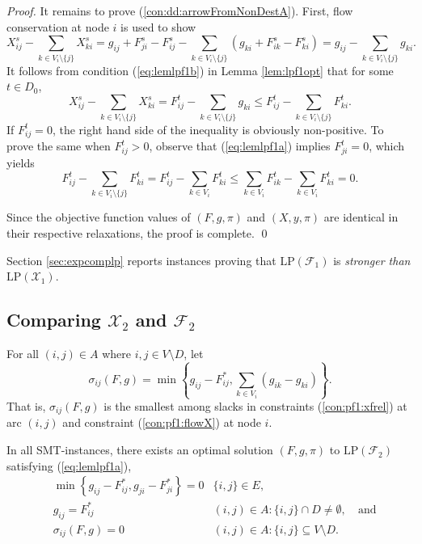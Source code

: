 \begin{proof}
It remains to prove (\ref{con:dd:arrowFromNonDestA}).
First, flow conservation at node $i$ is used to show
\[
  X_{ij}^s - \sum_{k\in V_{i}\setminus\{j\}}X^s_{ki} = g_{ij}+F_{ji}^s-F_{ij}^s - \sum_{k\in V_{i}\setminus\{j\}}\left(g_{ki}+F_{ik}^s-F_{ki}^s\right)
  = g_{ij}-\sum_{k\in V_{i}\setminus\{j\}}g_{ki}.
\]
It follows from condition (\ref{eq:lemlpf1b}) in Lemma \ref{lem:lpf1opt} that 
for some $t\in D_0$,
\[
  X_{ij}^s - \sum_{k\in V_{i}\setminus\{j\}}X^s_{ki}
  = F_{ij}^{t}-\sum_{k\in V_{i}\setminus\{j\}}g_{ki}
  \leq F_{ij}^{t}-\sum_{k\in V_{i}\setminus\{j\}}F_{ki}^{t}.
\]
If $F_{ij}^{t}=0$, the right hand side of the inequality is obviously non-positive.
To prove the same when $F_{ij}^{t}>0$, observe that (\ref{eq:lemlpf1a}) implies $F_{ji}^{t}=0$, which yields
\[
  F_{ij}^{t}-\sum_{k\in V_{i}\setminus\{j\}}F_{ki}^{t}
  = F_{ij}^{t}-\sum_{k\in V_{i}}F_{ki}^{t}
  \leq \sum_{k\in V_i}F_{ik}^{t}-\sum_{k\in V_{i}}F_{ki}^{t} = 0.
\]

Since the objective function values of $(F,g,\pi)$ and $(X,y,\pi)$ are identical in their respective relaxations, the proof is complete.
\qed\end{proof}

\begin{remark}
\label{rem:f1strx1}
Section \ref{sec:expcomplp} reports instances proving that $\text{LP}(\mathcal{F}_1)$ is \emph{stronger than} $\text{LP}(\mathcal{X}_1)$. 
\end{remark}

\subsection{Comparing $\mathcal{X}_2$ and $\mathcal{F}_2$}
For all $(i,j)\in A$ where $i,j\in V\setminus D$, let
$$\sigma_{ij}(F,g) = \min\left\{g_{ij} - F^*_{ij}, \sum_{k\in V_{i}}\left(g_{ik}-g_{ki}\right)\right\}.$$
That is, $\sigma_{ij}(F,g)$ is the smallest among slacks in constraints (\ref{con:pf1:xfrel}) at arc $(i,j)$ and constraint (\ref{con:pf1:flowX}) at node $i$.
 
\begin{lemma} \label{lem:lpf2}
In all SMT-instances, there exists an optimal solution $(F,g,\pi)$ to $\text{LP}(\mathcal{F}_2)$ satisfying (\ref{eq:lemlpf1a}),
\begin{subequations}
\begin{align}
 & \min\left\{g_{ij} - F_{ij}^*, g_{ji} - F_{ji}^*\right\} = 0 & \{i,j\}\in E, & \label{eq:lemlpf2a} \\
 & g_{ij} = F_{ij}^* & (i,j)\in A: \{i,j\}\cap D\neq\emptyset, & ~\text{and} \label{eq:lemlpf2b} \\
 & \sigma_{ij}(F,g)=0 & (i,j)\in A: \{i,j\}\subseteq V\setminus D. & \label{eq:lemlpf2c}
\end{align}
\end{subequations}
\end{lemma}

